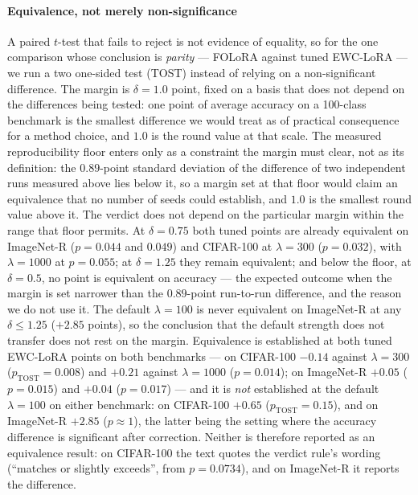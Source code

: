 \paragraph{Equivalence, not merely non-significance}
A paired $t$-test that fails to reject is not evidence of equality, so for the one comparison
whose conclusion is \emph{parity} --- FOLoRA against tuned EWC-LoRA --- we run a two
one-sided test (TOST) instead of relying on a non-significant difference. The margin is
$\delta{=}1.0$ point, fixed on a basis that does not depend on the differences being tested:
one point of average accuracy on a 100-class benchmark is the smallest difference we would
treat as of practical consequence for a method choice, and $1.0$ is the round value at that
scale. The measured reproducibility floor enters only as a constraint the margin must clear,
not as its definition: the $0.89$-point standard deviation of the difference of two
independent runs measured above lies below it, so a margin set at that floor would claim an
equivalence that no number of seeds could establish, and $1.0$ is the smallest round value
above it. The
verdict does not depend on the particular margin within the range that floor permits. At
$\delta{=}0.75$ both tuned points are already equivalent on ImageNet-R ($p=0.044$ and
$0.049$) and CIFAR-100 at $\lambda{=}300$ ($p=0.032$), with $\lambda{=}1000$ at $p=0.055$;
at $\delta{=}1.25$ they remain equivalent; and below the floor, at $\delta{=}0.5$, no point is
equivalent on accuracy --- the expected outcome when the margin is set narrower than the
$0.89$-point run-to-run difference, and the reason we do not use it. The default
$\lambda{=}100$ is never equivalent on ImageNet-R at any $\delta\le1.25$ ($+2.85$ points), so
the conclusion that the default strength does not transfer does not rest on the margin.
Equivalence is established at both tuned EWC-LoRA points on both benchmarks --- on CIFAR-100
$-0.14$ against $\lambda{=}300$ ($p_{\mathrm{TOST}}{=}0.008$) and $+0.21$ against
$\lambda{=}1000$ ($p{=}0.014$); on ImageNet-R $+0.05$ ($p{=}0.015$) and $+0.04$
($p{=}0.017$) --- and it is \emph{not} established at the default $\lambda{=}100$ on
either benchmark: on CIFAR-100 $+0.65$ ($p_{\mathrm{TOST}}{=}0.15$), and on ImageNet-R
$+2.85$ ($p\approx1$), the latter being the setting where the accuracy difference is
significant after correction. Neither is therefore reported as an equivalence result: on
CIFAR-100 the text quotes the verdict rule's wording (``matches or slightly
exceeds'', from $p{=}0.0734$), and on ImageNet-R it reports the difference.

